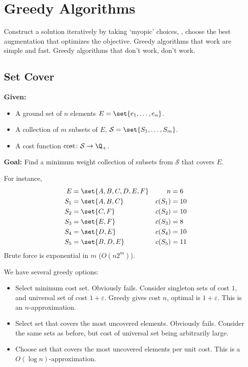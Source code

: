 
\section{Greedy Algorithms} \label{sec:greedy}
Construct a solution iteratively by taking `myopic' choices, \ie, choose the
best augmentation that optimizes the objective.
Greedy algorithms that work are simple and fast.
Greedy algorithms that don't work, don't work.

\subsection{Set Cover} \label{sec:set_cover}
\vspace{1em}
\begin{problem}
    \textbf{Given:}
    \begin{itemize}
        \item A ground set of $n$ elements $E = \set{e_1, \dots, e_n}$.
        \item A collection of $m$ subsets of $E$,
        $\mathcal{S} = \set{S_1, \dots, S_m}$.
        \item A cost function $\mathrm{cost} \colon \mathcal{S} \to \Q_+$.
    \end{itemize}
    \textbf{Goal:} Find a minimum weight collection of subsets from
    $\mathcal{S}$ that covers $E$.
\end{problem}
For instance, \begin{align*}
    E &= \set{A, B, C, D, E, F} & n &= 6 \\
    S_1 &= \set{A, B, C} & c(S_1) &= 10 \\
    S_2 &= \set{C, F} & c(S_2) &= 10 \\
    S_3 &= \set{E, F} & c(S_3) &= 8 \\
    S_4 &= \set{D, E} & c(S_4) &= 10 \\
    S_5 &= \set{B, D, E} & c(S_5) &= 11
\end{align*}
Brute force is exponential in $m$ ($O(n 2^m)$).

We have several greedy options:
\begin{itemize}
    \item Select minimum cost set.
    Obviously fails.
    Consider singleton sets of cost $1$, and universal set of cost
    $1 + \varepsilon$.
    Greedy gives cost $n$, optimal is $1 + \varepsilon$.
    This is an $n$-approximation.
    \item Select set that covers the most uncovered elements.
    Obviously fails.
    Consider the same sets as before, but cost of universal set being
    arbitrarily large.
    \item Choose set that covers the most uncovered elements per unit cost.
    This is a $O(\log n)$-approximation.
\end{itemize}

